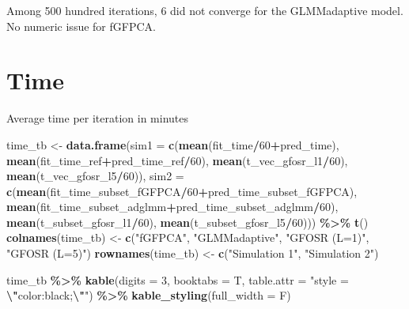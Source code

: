 \documentclass[
]{article}
\newenvironment{Shaded}{\begin{snugshade}}{\end{snugshade}}
\newcommand{\AttributeTok}[1]{\textcolor[rgb]{0.13,0.29,0.53}{#1}}
\newcommand{\DecValTok}[1]{\textcolor[rgb]{0.00,0.00,0.81}{#1}}
\newcommand{\FunctionTok}[1]{\textcolor[rgb]{0.13,0.29,0.53}{\textbf{#1}}}
\newcommand{\NormalTok}[1]{#1}
\newcommand{\OtherTok}[1]{\textcolor[rgb]{0.56,0.35,0.01}{#1}}
\newcommand{\SpecialCharTok}[1]{\textcolor[rgb]{0.81,0.36,0.00}{\textbf{#1}}}
\newcommand{\StringTok}[1]{\textcolor[rgb]{0.31,0.60,0.02}{#1}}
\begin{document}
Among 500 hundred iterations, 6 did not converge for the GLMMadaptive
model. No numeric issue for fGFPCA.

\section{Time}\label{time}

Average time per iteration in minutes

\begin{Shaded}
\begin{Highlighting}[]
\NormalTok{time\_tb }\OtherTok{\textless{}{-}} \FunctionTok{data.frame}\NormalTok{(}\AttributeTok{sim1 =} \FunctionTok{c}\NormalTok{(}\FunctionTok{mean}\NormalTok{(fit\_time}\SpecialCharTok{/}\DecValTok{60}\SpecialCharTok{+}\NormalTok{pred\_time),}
             \FunctionTok{mean}\NormalTok{(fit\_time\_ref}\SpecialCharTok{+}\NormalTok{pred\_time\_ref}\SpecialCharTok{/}\DecValTok{60}\NormalTok{),}
             \FunctionTok{mean}\NormalTok{(t\_vec\_gfosr\_l1}\SpecialCharTok{/}\DecValTok{60}\NormalTok{), }
             \FunctionTok{mean}\NormalTok{(t\_vec\_gfosr\_l5}\SpecialCharTok{/}\DecValTok{60}\NormalTok{)),}
           \AttributeTok{sim2 =} \FunctionTok{c}\NormalTok{(}\FunctionTok{mean}\NormalTok{(fit\_time\_subset\_fGFPCA}\SpecialCharTok{/}\DecValTok{60}\SpecialCharTok{+}\NormalTok{pred\_time\_subset\_fGFPCA),}
             \FunctionTok{mean}\NormalTok{(fit\_time\_subset\_adglmm}\SpecialCharTok{+}\NormalTok{pred\_time\_subset\_adglmm}\SpecialCharTok{/}\DecValTok{60}\NormalTok{),}
             \FunctionTok{mean}\NormalTok{(t\_subset\_gfosr\_l1}\SpecialCharTok{/}\DecValTok{60}\NormalTok{), }
             \FunctionTok{mean}\NormalTok{(t\_subset\_gfosr\_l5}\SpecialCharTok{/}\DecValTok{60}\NormalTok{))) }\SpecialCharTok{\%\textgreater{}\%} \FunctionTok{t}\NormalTok{()}
\FunctionTok{colnames}\NormalTok{(time\_tb) }\OtherTok{\textless{}{-}} \FunctionTok{c}\NormalTok{(}\StringTok{"fGFPCA"}\NormalTok{, }\StringTok{"GLMMadaptive"}\NormalTok{, }\StringTok{"GFOSR (L=1)"}\NormalTok{, }\StringTok{"GFOSR (L=5)"}\NormalTok{)}
\FunctionTok{rownames}\NormalTok{(time\_tb) }\OtherTok{\textless{}{-}} \FunctionTok{c}\NormalTok{(}\StringTok{"Simulation 1"}\NormalTok{, }\StringTok{"Simulation 2"}\NormalTok{)}
\end{Highlighting}
\end{Shaded}

\begin{Shaded}
\begin{Highlighting}[]
\NormalTok{time\_tb }\SpecialCharTok{\%\textgreater{}\%} 
  \FunctionTok{kable}\NormalTok{(}\AttributeTok{digits =} \DecValTok{3}\NormalTok{, }\AttributeTok{booktabs =}\NormalTok{ T, }\AttributeTok{table.attr =} \StringTok{"style = }\SpecialCharTok{\textbackslash{}"}\StringTok{color:black;}\SpecialCharTok{\textbackslash{}"}\StringTok{"}\NormalTok{) }\SpecialCharTok{\%\textgreater{}\%}
  \FunctionTok{kable\_styling}\NormalTok{(}\AttributeTok{full\_width =}\NormalTok{ F) }
\end{Highlighting}
\end{Shaded}
\end{document}
